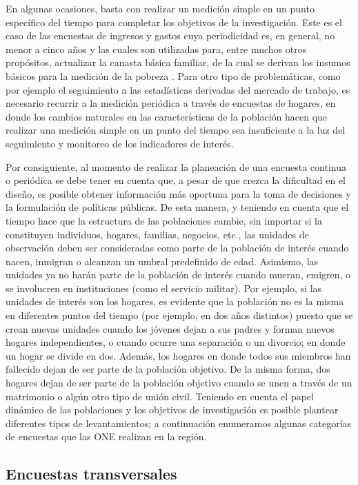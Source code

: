 \documentclass[
  12pt,
  spanish,
]{book}
\begin{document}
En algunas ocasiones, basta con realizar un medición simple en un punto específico del tiempo para completar los objetivos de la investigación. Este es el caso de las encuestas de ingresos y gastos cuya periodicidad es, en general, no menor a cinco años y las cuales son utilizadas para, entre muchos otros propósitos, actualizar la canasta básica familiar, de la cual se derivan los insumos básicos para la medición de la pobreza \citep{CEPAL_2018}. Para otro tipo de problemáticas, como por ejemplo el seguimiento a las estadísticas derivadas del mercado de trabajo, es necesario recurrir a la medición periódica a través de encuestas de hogares, en donde los cambios naturales en las características de la población hacen que realizar una medición simple en un punto del tiempo sea insuficiente a la luz del seguimiento y monitoreo de los indicadores de interés.

Por consiguiente, al momento de realizar la planeación de una encuesta continua o periódica se debe tener en cuenta que, a pesar de que crezca la dificultad en el diseño, es posible obtener información más oportuna para la toma de decisiones y la formulación de políticas públicas. De esta manera, y teniendo en cuenta que el tiempo hace que la estructura de las poblaciones cambie, sin importar si la constituyen individuos, hogares, familias, negocios, etc., las unidades de observación deben ser consideradas como parte de la población de interés cuando nacen, inmigran o alcanzan un umbral predefinido de edad. Asimismo, las unidades ya no harán parte de la población de interés cuando mueran, emigren, o se involucren en instituciones (como el servicio militar). Por ejemplo, si las unidades de interés son los hogares, es evidente que la población no es la misma en diferentes puntos del tiempo (por ejemplo, en dos años distintos) puesto que se crean nuevas unidades cuando los jóvenes dejan a sus padres y forman nuevos hogares independientes, o cuando ocurre una separación o un divorcio; en donde un hogar se divide en dos. Además, los hogares en donde todos sus miembros han fallecido dejan de ser parte de la población objetivo. De la misma forma, dos hogares dejan de ser parte de la población objetivo cuando se unen a través de un matrimonio o algún otro tipo de unión civil. Teniendo en cuenta el papel dinámico de las poblaciones y los objetivos de investigación es posible plantear diferentes tipos de levantamientos; a continuación enumeramos algunas categorías de encuestas que las ONE realizan en la región.

\hypertarget{encuestas-transversales}{%
\subsection*{Encuestas transversales}\label{encuestas-transversales}}
\end{document}
